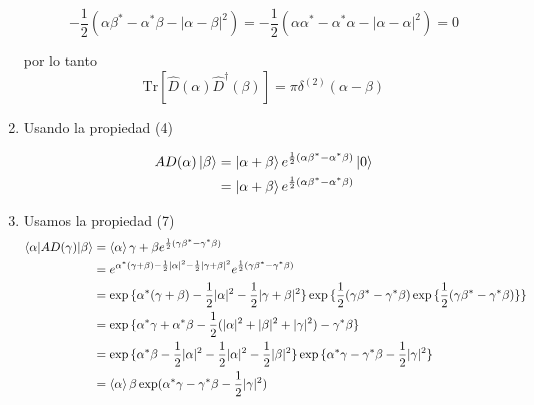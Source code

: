 \begin{enumerate}
\begin{equation*}
 -\frac{1}{2}(\alpha\beta^* - \alpha^* \beta -|\alpha - \beta|^2) = -\frac{1}{2}(\alpha\alpha^* - \alpha^*\alpha -|\alpha - \alpha|^2) = 0
\end{equation*}

por lo tanto
\begin{equation*}
\mathrm{Tr}[\hat{D}(\alpha)\hat{D}^\dagger(\beta)] = \pi \delta^{(2)}(\alpha-\beta)
\end{equation*}
\item Usando la propiedad (4)
	
\begin{align*}
A{D}(\alpha)\ket{\beta} & = \ket{\alpha + \beta} e^{\frac{1}{2}(\alpha\beta^* - \alpha^*\beta)}\ket{0} \\
& = \ket{\alpha + \beta} e^{\frac{1}{2}(\alpha\beta^* - \alpha^*\beta)}
\end{align*}
\item Usamos la propiedad (7)
\begin{align*}
\langle \alpha \vert A{D}(\gamma)\vert \beta\rangle & = \braket{\alpha}{\gamma + \beta} e^{\frac{1}{2}(\gamma\beta^{*}-\gamma^{*}\beta)}                                                           \\
& = e^{\alpha^*(\gamma + \beta) - \frac{1}{2}|\alpha|^2 - \frac{1}{2}|\gamma + \beta|^2}e^{\frac{1}{2}(\gamma\beta^* - \gamma^*\beta)} \\
& = \exp{\{ \alpha^*(\gamma + \beta) - \frac{1}{2}|\alpha|^2 -\frac{1}{2}|\gamma + \beta|^2 \}} \exp{\{ \frac{1}{2}(\gamma\beta^* - \gamma^*\beta)\exp{\{\frac{1}{2}(\gamma\beta^* - \gamma^*\beta)\}} \}} \\
& = \exp{\{ \alpha^*\gamma + \alpha^*\beta - \frac{1}{2}(|\alpha|^2 + |\beta|^2 + |\gamma|^2) - \gamma^*\beta \}} \\
& = \exp{\{ \alpha^*\beta - \frac{1}{2}|\alpha|^2 - \frac{1}{2}|\alpha|^2 - \frac{1}{2}|\beta|^2 \}} \exp{\{ \alpha^* \gamma - \gamma^*\beta -\frac{1}{2}|\gamma|^2 \}}                                    \\
& = \braket{\alpha}{\beta}\exp(\alpha^*\gamma - \gamma^*\beta - \frac{1}{2}|\gamma|^2)
\end{align*}


\end{enumerate}
